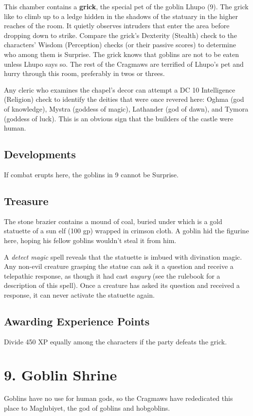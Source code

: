 \documentclass[10pt,a4paper,twoside,bg=print,twocolumn,openany,nodeprecatedcode]{dndbook}
\begin{document}
This chamber contains a \textbf{grick}, the special pet of the goblin Lhupo (9). The grick like to climb up to a ledge hidden in the shadows of the statuary in the higher reaches of the room. It quietly observes intruders that enter the area before dropping down to strike. Compare the grick's Dexterity (Stealth) check to the characters' Wisdom (Perception) checks (or their passive scores) to determine who among them is Surprise. The grick knows that goblins are not to be eaten unless Lhupo says so. The rest of the Cragmaws are terrified of Lhupo's pet and hurry through this room, preferably in twos or threes.

Any cleric who examines the chapel's decor can attempt a DC 10 Intelligence (Religion) check to identify the deities that were once revered here: Oghma (god of knowledge), Mystra (goddess of magic), Lathander (god of dawn), and Tymora (goddess of luck). This is an obvious sign that the builders of the castle were human.

\subsection{Developments}
If combat erupts here, the goblins in 9 cannot be Surprise.

\subsection{Treasure}
The stone brazier contains a mound of coal, buried under which is a gold statuette of a sun elf (100 gp) wrapped in crimson cloth. A goblin hid the figurine here, hoping his fellow goblins wouldn't steal it from him.

A \textit{detect magic} spell reveals that the statuette is imbued with divination magic. Any non-evil creature grasping the statue can ask it a question and receive a telepathic response, as though it had cast \textit{augury} (see the rulebook for a description of this spell). Once a creature has asked its question and received a response, it can never activate the statuette again.

\subsection{Awarding Experience Points}
Divide 450 XP equally among the characters if the party defeats the grick.

\section{9. Goblin Shrine}
Goblins have no use for human gods, so the Cragmaws have rededicated this place to Maglubiyet, the god of goblins and hobgoblins.
\end{document}
